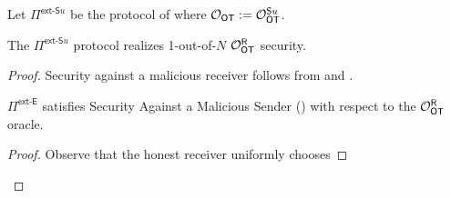 \begin{definition}\label{def:ext_Su_R}
	Let $\Pi^{\textsf{ext-S}u}$ be the protocol of  where $\mathcal{O}_{\mathsf{OT}}:=\mathcal{O}_{\mathsf{OT}}^{\mathsf{S} u}$.
\end{definition}
\begin{lemma}
	The $\Pi^{\textsf{ext-S}u}$ protocol realizes 1-out-of-$N$ $\mathcal{O}_{\mathsf{OT}}^\mathsf{R}$ security.
\end{lemma}
\begin{proof}
	Security against a malicious receiver follows from  and . 
	
	
	\begin{claim}\label{claim:ext-Su-MalSender}
		$\Pi^\textsf{ext-E}$ satisfies Security Against a Malicious Sender () with respect to the $\mathcal{O}_{\mathsf{OT}}^\mathsf{R}$ oracle.
	\end{claim}
	\begin{proof}
		Observe that the honest receiver uniformly chooses
	\end{proof}
\end{proof}


